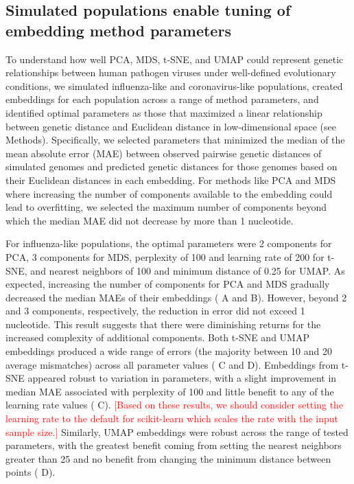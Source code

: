 \documentclass[10pt,letterpaper]{article}
\def\jhc#1{\textcolor{red}{[#1]}}
\begin{document}
\subsection*{Simulated populations enable tuning of embedding method parameters}

To understand how well PCA, MDS, t-SNE, and UMAP could represent genetic relationships between human pathogen viruses under well-defined evolutionary conditions, we simulated influenza-like and coronavirus-like populations, created embeddings for each population across a range of method parameters, and identified optimal parameters as those that maximized a linear relationship between genetic distance and Euclidean distance in low-dimensional space (see Methods).
Specifically, we selected parameters that minimized the median of the mean absolute error (MAE) between observed pairwise genetic distances of simulated genomes and predicted genetic distances for those genomes based on their Euclidean distances in each embedding.
For methods like PCA and MDS where increasing the number of components available to the embedding could lead to overfitting, we selected the maximum number of components beyond which the median MAE did not decrease by more than 1 nucleotide.

For influenza-like populations, the optimal parameters were 2 components for PCA, 3 components for MDS, perplexity of 100 and learning rate of 200 for t-SNE, and nearest neighbors of 100 and minimum distance of 0.25 for UMAP.
As expected, increasing the number of components for PCA and MDS gradually decreased the median MAEs of their embeddings ( A and B).
However, beyond 2 and 3 components, respectively, the reduction in error did not exceed 1 nucleotide.
This result suggests that there were diminishing returns for the increased complexity of additional components.
Both t-SNE and UMAP embeddings produced a wide range of errors (the majority between 10 and 20 average mismatches) across all parameter values ( C and D).
Embeddings from t-SNE appeared robust to variation in parameters, with a slight improvement in median MAE associated with perplexity of 100 and little benefit to any of the learning rate values ( C).
\jhc{Based on these results, we should consider setting the learning rate to the default for scikit-learn which scales the rate with the input sample size.}
Similarly, UMAP embeddings were robust across the range of tested parameters, with the greatest benefit coming from setting the nearest neighbors greater than 25 and no benefit from changing the minimum distance between points ( D).
\end{document}
